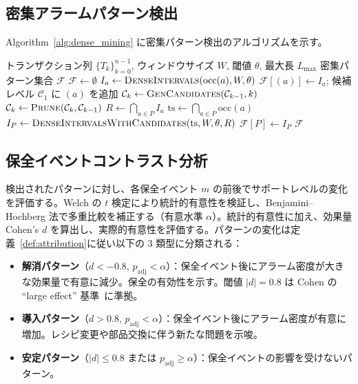 \documentclass[11pt]{article}
\begin{document}
\subsection{密集アラームパターン検出}

Algorithm~\ref{alg:dense_mining} に密集パターン検出のアルゴリズムを示す。

\begin{algorithm}[t]
\caption{密集アラームパターンマイニング}
\label{alg:dense_mining}
\begin{algorithmic}[1]
\Require トランザクション列 $\{T_k\}_{k=0}^{n-1}$, ウィンドウサイズ $W$, 閾値 $\theta$, 最大長 $L_{\max}$
\Ensure 密集パターン集合 $\mathcal{F}$
\State $\mathcal{F} \gets \emptyset$
    \State $I_a \gets \textsc{DenseIntervals}(\mathrm{occ}(a), W, \theta)$
        \State $\mathcal{F}[(a)] \gets I_a$; 候補レベル $\mathcal{C}_1$ に $(a)$ を追加
    \EndIf
\EndFor
{}
    \State $\mathcal{C}_k \gets \textsc{GenCandidates}(\mathcal{C}_{k-1}, k)$
    \State $\mathcal{C}_k \gets \textsc{Prune}(\mathcal{C}_k, \mathcal{C}_{k-1})$ 
        \State $R \gets \bigcap_{a \in P} I_a$ 
        \State $\mathrm{ts} \gets \bigcap_{a \in P} \mathrm{occ}(a)$ 
        \State $I_P \gets \textsc{DenseIntervalsWithCandidates}(\mathrm{ts}, W, \theta, R)$
            \State $\mathcal{F}[P] \gets I_P$
        \EndIf
    \EndFor
\EndFor
\Return $\mathcal{F}$
\end{algorithmic}
\end{algorithm}

\subsection{保全イベントコントラスト分析}

検出されたパターンに対し、各保全イベント $m$ の前後でサポートレベルの変化を評価する。Welch の $t$ 検定により統計的有意性を検証し、Benjamini--Hochberg 法で多重比較を補正する（有意水準 $\alpha$）。統計的有意性に加え、効果量 Cohen's $d$ を算出し、実際的有意性を評価する。パターンの変化は定義~\ref{def:attribution}に従い以下の 3 類型に分類される：

\begin{itemize}
    \item \textbf{解消パターン}（$d < -0.8$, $p_{\mathrm{adj}} < \alpha$）：保全イベント後にアラーム密度が大きな効果量で有意に減少。保全の有効性を示す。閾値 $|d| = 0.8$ は Cohen の ``large effect'' 基準~\citep{cohen1988statistical}に準拠。
    \item \textbf{導入パターン}（$d > 0.8$, $p_{\mathrm{adj}} < \alpha$）：保全イベント後にアラーム密度が有意に増加。レシピ変更や部品交換に伴う新たな問題を示唆。
    \item \textbf{安定パターン}（$|d| \leq 0.8$ または $p_{\mathrm{adj}} \geq \alpha$）：保全イベントの影響を受けないパターン。
\end{itemize}
\end{document}
